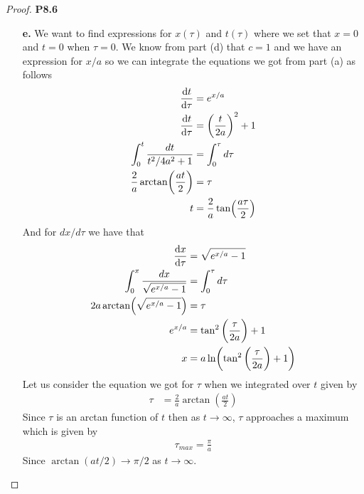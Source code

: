 \documentclass[11pt]{article}
\theoremstyle{definition}
\begin{document}
\begin{proof}{\textbf{P8.6}}
\begin{itemize}
        \item [\textbf{e.}] We want to find expressions for $x(\tau)$ and
        $t(\tau)$ where we set that $x=0$ and $t=0$ when $\tau = 0$.
        We know from part (d) that $c = 1$ and we have an expression for $x/a$
        so we can integrate the equations we got from part (a)
        as follows
        \begin{align*}
            \derivative{t}{\tau} &= e^{x/a}\\
            \derivative{t}{\tau} &= \bigg(\frac{t}{2a}\bigg)^2 + 1\\
            \int_{0}^t \frac{dt}{t^2/4a^2  + 1} &= \int_0^\tau d\tau\\
            \frac{2}{a}\arctan(\frac{at}{2}) &= \tau\\
            t &= \frac{2}{a}\tan(\frac{a\tau}{2})
        \end{align*}
        And for $dx/d\tau$ we have that
        \begin{align*}
            \derivative{x}{\tau} &= \sqrt{e^{x/a} - 1}\\
            \int_{0}^x \frac{dx}{\sqrt{e^{x/a} - 1}} &= \int_0^\tau d\tau\\
            2a\arctan(\sqrt{e^{x/a} - 1}) &= \tau\\
            e^{x/a} &= \tan^2\bigg(\frac{\tau}{2a}\bigg) + 1\\
            x &= a\ln(\tan^2\bigg(\frac{\tau}{2a}\bigg) + 1)
        \end{align*}
        Let us consider the equation we got for $\tau$ when we integrated over
        $t$ given by
        \begin{align*}
            \tau &= \frac{2}{a}\arctan(\frac{at}{2})
        \end{align*}
        Since $\tau$ is an arctan function of $t$ then as $t \to \infty$,
        $\tau$ approaches a maximum which is given by
        \begin{align*}
            \tau_{max} = \frac{\pi}{a} 
        \end{align*}
        Since $\arctan(at/2) \to \pi/2$ as $t \to \infty$.
    \end{itemize}
\end{proof}
\cleardoublepage
\end{document}
